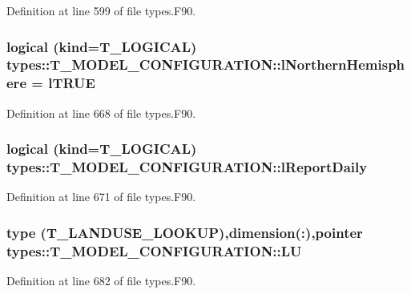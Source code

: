 Definition at line 599 of file types.F90.

\hypertarget{typetypes_1_1_t___m_o_d_e_l___c_o_n_f_i_g_u_r_a_t_i_o_n_a932d20830fb29ba127ef4b62868a5fe9}{
\subsubsection[{lNorthernHemisphere}]{\setlength{\rightskip}{0pt plus 5cm}logical (kind={\bf T\_\-LOGICAL}) {\bf types::T\_\-MODEL\_\-CONFIGURATION::lNorthernHemisphere} = {\bf lTRUE}}}
\label{typetypes_1_1_t___m_o_d_e_l___c_o_n_f_i_g_u_r_a_t_i_o_n_a932d20830fb29ba127ef4b62868a5fe9}


Definition at line 668 of file types.F90.

\hypertarget{typetypes_1_1_t___m_o_d_e_l___c_o_n_f_i_g_u_r_a_t_i_o_n_a783c6237cb9a0d9dd443a04b4227a7c2}{
\subsubsection[{lReportDaily}]{\setlength{\rightskip}{0pt plus 5cm}logical (kind={\bf T\_\-LOGICAL}) {\bf types::T\_\-MODEL\_\-CONFIGURATION::lReportDaily}}}
\label{typetypes_1_1_t___m_o_d_e_l___c_o_n_f_i_g_u_r_a_t_i_o_n_a783c6237cb9a0d9dd443a04b4227a7c2}


Definition at line 671 of file types.F90.

\hypertarget{typetypes_1_1_t___m_o_d_e_l___c_o_n_f_i_g_u_r_a_t_i_o_n_af0d8d8090bac1375c95ea5588e49abda}{
\subsubsection[{LU}]{\setlength{\rightskip}{0pt plus 5cm}type ({\bf T\_\-LANDUSE\_\-LOOKUP}),dimension(:),pointer {\bf types::T\_\-MODEL\_\-CONFIGURATION::LU}}}
\label{typetypes_1_1_t___m_o_d_e_l___c_o_n_f_i_g_u_r_a_t_i_o_n_af0d8d8090bac1375c95ea5588e49abda}


Definition at line 682 of file types.F90.

